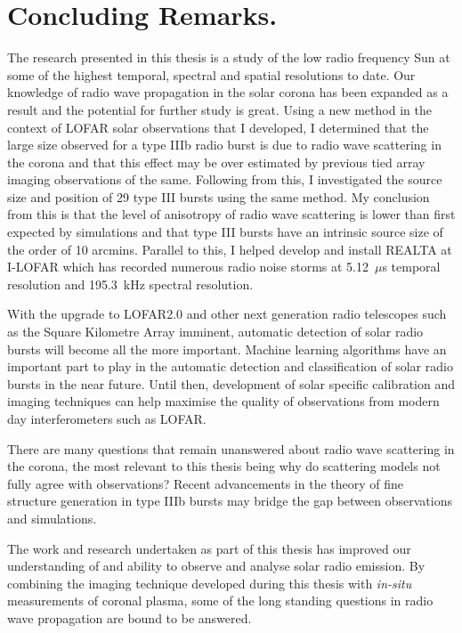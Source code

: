 \section{Concluding Remarks.}
The research presented in this thesis is a study of the low radio frequency Sun at some of the highest temporal, spectral and spatial resolutions to date. Our knowledge of radio wave propagation in the solar corona has been expanded as a result and the potential for further study is great. Using a new method in the context of LOFAR solar observations that I developed, I determined that the large size observed for a type IIIb radio burst is due to radio wave scattering in the corona and that this effect may be over estimated by previous tied array imaging observations of the same. Following from this, I investigated the source size and position of 29 type III bursts using the same method. My conclusion from this is that the level of anisotropy of radio wave scattering is lower than first expected by simulations and that type III bursts have an intrinsic source size of the order of 10 arcmins. Parallel to this, I helped develop and install REALTA at I-LOFAR which has recorded numerous radio noise storms at 5.12~$\mu$s temporal resolution and 195.3~kHz spectral resolution. 

With the upgrade to LOFAR2.0 and other next generation radio telescopes such as the Square Kilometre Array \citep[SKA;][]{McMullin2020} imminent, automatic detection of solar radio bursts will become all the more important. Machine learning algorithms have an important part to play in the automatic detection and classification of solar radio bursts in the near future. Until then, development of solar specific calibration and imaging techniques can help maximise the quality of observations from modern day interferometers such as LOFAR.  

There are many questions that remain unanswered about radio wave scattering in the corona, the most relevant to this thesis being why do scattering models not fully agree with observations? Recent advancements in the theory of fine structure generation in type IIIb bursts may bridge the gap between observations and simulations.

The work and research undertaken as part of this thesis has improved our understanding of and ability to observe and analyse solar radio emission. By combining the imaging technique developed during this thesis with \textit{in-situ} measurements of coronal plasma, some of the long standing questions in radio wave propagation are bound to be answered. 














